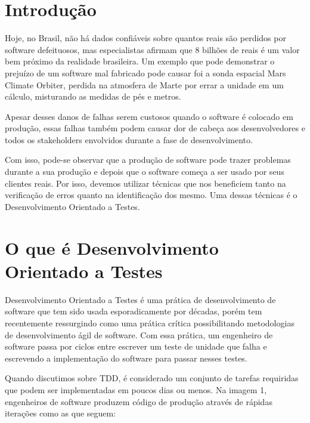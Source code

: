 \documentclass[12pt]{article}
\begin{document}
  \clearpage

  \renewcommand*\contentsname{Sumário}

  \tableofcontents

  \clearpage

  \section{Introdução}

  Hoje, no Brasil, não há dados confiáveis sobre quantos reais são perdidos por
  software defeituosos, mas especialistas afirmam que 8 bilhões de reais é um
  valor bem próximo da realidade brasileira. Um exemplo que pode demonstrar o 
  prejuízo de um software mal fabricado pode causar foi a sonda espacial Mars 
  Climate Orbiter, perdida na atmosfera de Marte por errar a unidade em um
  cálculo, misturando as medidas de pés e metros.

  Apesar desses danos de falhas serem custosos quando o software é colocado em
  produção, essas falhas também podem causar dor de cabeça aos desenvolvedores e
  todos os stakeholders envolvidos durante a fase de desenvolvimento.

  Com isso, pode-se observar que a produção de software pode trazer problemas
  durante a sua produção e depois que o software começa a ser usado por seus
  clientes reais. Por isso, devemos utilizar técnicas que nos beneficiem tanto
  na verificação de erros quanto na identificação dos mesmo. Uma dessas técnicas
  é o Desenvolvimento Orientado a Testes.

  \section{O que é Desenvolvimento Orientado a Testes}

  Desenvolvimento Orientado a Testes
   é uma prática de desenvolvimento de software que tem 
  sido usada esporadicamente por décadas, porém tem recentemente ressurgindo 
  como uma prática crítica 
  possibilitando metodologias de desenvolvimento ágil de software. Com essa 
  prática, um engenheiro de 
  software passa por ciclos entre escrever um teste de unidade que falha e 
  escrevendo a implementação do software para passar nesses testes. 

  Quando discutimos sobre TDD, é considerado um conjunto de tarefas requiridas 
  que podem ser implementadas em poucos dias ou menos. Na imagem 1, engenheiros 
  de software produzem código de produção através de rápidas iterações como as 
  que seguem:
\end{document}

